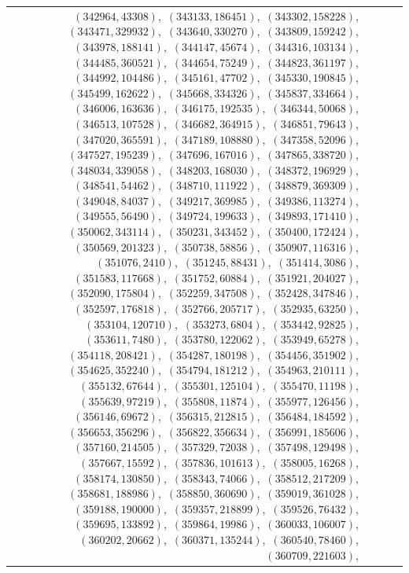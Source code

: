 \documentclass[11pt]{article}
\begin{document}
\begin{longtable}{@{}rrl>{\raggedright\arraybackslash}p{}@{}}
$(342964,43308)$,\allowbreak\ $(343133,186451)$,\allowbreak\ $(343302,158228)$,\allowbreak\ $(343471,329932)$,\allowbreak\ $(343640,330270)$,\allowbreak\ $(343809,159242)$,\allowbreak\ $(343978,188141)$,\allowbreak\ $(344147,45674)$,\allowbreak\ $(344316,103134)$,\allowbreak\ $(344485,360521)$,\allowbreak\ $(344654,75249)$,\allowbreak\ $(344823,361197)$,\allowbreak\ $(344992,104486)$,\allowbreak\ $(345161,47702)$,\allowbreak\ $(345330,190845)$,\allowbreak\ $(345499,162622)$,\allowbreak\ $(345668,334326)$,\allowbreak\ $(345837,334664)$,\allowbreak\ $(346006,163636)$,\allowbreak\ $(346175,192535)$,\allowbreak\ $(346344,50068)$,\allowbreak\ $(346513,107528)$,\allowbreak\ $(346682,364915)$,\allowbreak\ $(346851,79643)$,\allowbreak\ $(347020,365591)$,\allowbreak\ $(347189,108880)$,\allowbreak\ $(347358,52096)$,\allowbreak\ $(347527,195239)$,\allowbreak\ $(347696,167016)$,\allowbreak\ $(347865,338720)$,\allowbreak\ $(348034,339058)$,\allowbreak\ $(348203,168030)$,\allowbreak\ $(348372,196929)$,\allowbreak\ $(348541,54462)$,\allowbreak\ $(348710,111922)$,\allowbreak\ $(348879,369309)$,\allowbreak\ $(349048,84037)$,\allowbreak\ $(349217,369985)$,\allowbreak\ $(349386,113274)$,\allowbreak\ $(349555,56490)$,\allowbreak\ $(349724,199633)$,\allowbreak\ $(349893,171410)$,\allowbreak\ $(350062,343114)$,\allowbreak\ $(350231,343452)$,\allowbreak\ $(350400,172424)$,\allowbreak\ $(350569,201323)$,\allowbreak\ $(350738,58856)$,\allowbreak\ $(350907,116316)$,\allowbreak\ $(351076,2410)$,\allowbreak\ $(351245,88431)$,\allowbreak\ $(351414,3086)$,\allowbreak\ $(351583,117668)$,\allowbreak\ $(351752,60884)$,\allowbreak\ $(351921,204027)$,\allowbreak\ $(352090,175804)$,\allowbreak\ $(352259,347508)$,\allowbreak\ $(352428,347846)$,\allowbreak\ $(352597,176818)$,\allowbreak\ $(352766,205717)$,\allowbreak\ $(352935,63250)$,\allowbreak\ $(353104,120710)$,\allowbreak\ $(353273,6804)$,\allowbreak\ $(353442,92825)$,\allowbreak\ $(353611,7480)$,\allowbreak\ $(353780,122062)$,\allowbreak\ $(353949,65278)$,\allowbreak\ $(354118,208421)$,\allowbreak\ $(354287,180198)$,\allowbreak\ $(354456,351902)$,\allowbreak\ $(354625,352240)$,\allowbreak\ $(354794,181212)$,\allowbreak\ $(354963,210111)$,\allowbreak\ $(355132,67644)$,\allowbreak\ $(355301,125104)$,\allowbreak\ $(355470,11198)$,\allowbreak\ $(355639,97219)$,\allowbreak\ $(355808,11874)$,\allowbreak\ $(355977,126456)$,\allowbreak\ $(356146,69672)$,\allowbreak\ $(356315,212815)$,\allowbreak\ $(356484,184592)$,\allowbreak\ $(356653,356296)$,\allowbreak\ $(356822,356634)$,\allowbreak\ $(356991,185606)$,\allowbreak\ $(357160,214505)$,\allowbreak\ $(357329,72038)$,\allowbreak\ $(357498,129498)$,\allowbreak\ $(357667,15592)$,\allowbreak\ $(357836,101613)$,\allowbreak\ $(358005,16268)$,\allowbreak\ $(358174,130850)$,\allowbreak\ $(358343,74066)$,\allowbreak\ $(358512,217209)$,\allowbreak\ $(358681,188986)$,\allowbreak\ $(358850,360690)$,\allowbreak\ $(359019,361028)$,\allowbreak\ $(359188,190000)$,\allowbreak\ $(359357,218899)$,\allowbreak\ $(359526,76432)$,\allowbreak\ $(359695,133892)$,\allowbreak\ $(359864,19986)$,\allowbreak\ $(360033,106007)$,\allowbreak\ $(360202,20662)$,\allowbreak\ $(360371,135244)$,\allowbreak\ $(360540,78460)$,\allowbreak\ $(360709,221603)$,\allowbreak\ 
\end{longtable}
\end{document}
